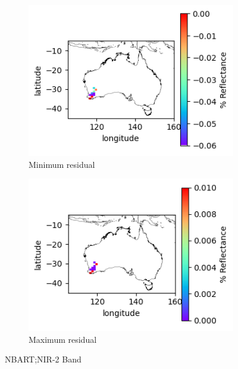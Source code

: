 \documentclass[a4paper]{article}
\begin{document}
      \begin{figure}[h!]
        \centering
          \begin{subfigure}[l]{.4\linewidth}
            \hspace{-32mm}
            \includegraphics[scale=0.9]{plots/nbart/nbart_nir_2-MinResidual.png}
            \caption{Minimum residual}
          \end{subfigure}
%
          \begin{subfigure}[r]{.4\linewidth}
            \includegraphics[scale=0.9]{plots/nbart/nbart_nir_2-MaxResidual.png}
            \caption{Maximum residual}
          \end{subfigure}
        \caption{NBART;\@ NIR-2 Band}\label{figure:17}
      \end{figure}
\end{document}
